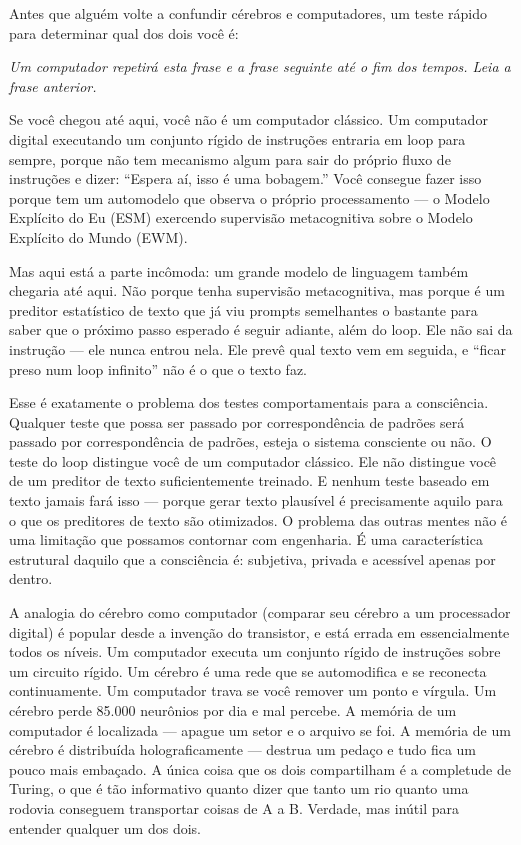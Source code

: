 \documentclass[11pt, twoside, openright]{book}
\begin{document}
Antes que alguém volte a confundir cérebros e computadores, um teste rápido para determinar qual dos dois você é:

\textit{Um computador repetirá esta frase e a frase seguinte até o fim dos tempos. Leia a frase anterior.}

Se você chegou até aqui, você não é um computador clássico. Um computador digital executando um conjunto rígido de instruções entraria em loop para sempre, porque não tem mecanismo algum para sair do próprio fluxo de instruções e dizer: ``Espera aí, isso é uma bobagem.'' Você consegue fazer isso porque tem um automodelo que observa o próprio processamento --- o Modelo Explícito do Eu (ESM) exercendo supervisão metacognitiva sobre o Modelo Explícito do Mundo (EWM).

Mas aqui está a parte incômoda: um grande modelo de linguagem também chegaria até aqui. Não porque tenha supervisão metacognitiva, mas porque é um preditor estatístico de texto que já viu prompts semelhantes o bastante para saber que o próximo passo esperado é seguir adiante, além do loop. Ele não sai da instrução --- ele nunca entrou nela. Ele prevê qual texto vem em seguida, e ``ficar preso num loop infinito'' não é o que o texto faz.

Esse é exatamente o problema dos testes comportamentais para a consciência. Qualquer teste que possa ser passado por correspondência de padrões será passado por correspondência de padrões, esteja o sistema consciente ou não. O teste do loop distingue você de um computador clássico. Ele não distingue você de um preditor de texto suficientemente treinado. E nenhum teste baseado em texto jamais fará isso --- porque gerar texto plausível é precisamente aquilo para o que os preditores de texto são otimizados. O problema das outras mentes não é uma limitação que possamos contornar com engenharia. É uma característica estrutural daquilo que a consciência é: subjetiva, privada e acessível apenas por dentro.

A analogia do cérebro como computador (comparar seu cérebro a um processador digital) é popular desde a invenção do transistor, e está errada em essencialmente todos os níveis. Um computador executa um conjunto rígido de instruções sobre um circuito rígido. Um cérebro é uma rede que se automodifica e se reconecta continuamente. Um computador trava se você remover um ponto e vírgula. Um cérebro perde 85.000 neurônios por dia e mal percebe. A memória de um computador é localizada --- apague um setor e o arquivo se foi. A memória de um cérebro é distribuída holograficamente --- destrua um pedaço e tudo fica um pouco mais embaçado. A única coisa que os dois compartilham é a completude de Turing, o que é tão informativo quanto dizer que tanto um rio quanto uma rodovia conseguem transportar coisas de A a B. Verdade, mas inútil para entender qualquer um dos dois.
\end{document}
